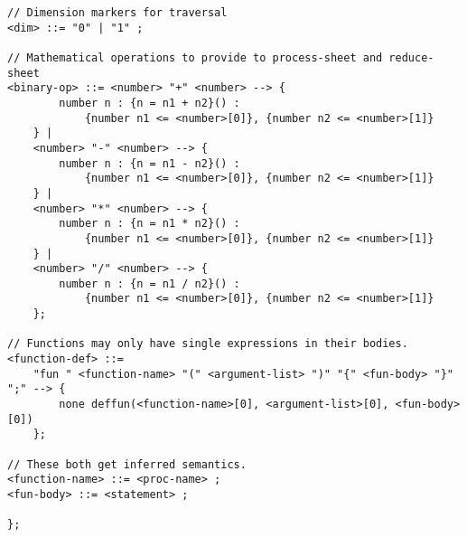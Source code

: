 \begin{verbatim}
// Dimension markers for traversal
<dim> ::= "0" | "1" ;

// Mathematical operations to provide to process-sheet and reduce-sheet
<binary-op> ::= <number> "+" <number> --> {
        number n : {n = n1 + n2}() :
            {number n1 <= <number>[0]}, {number n2 <= <number>[1]}
    } |
    <number> "-" <number> --> {
        number n : {n = n1 - n2}() :
            {number n1 <= <number>[0]}, {number n2 <= <number>[1]}
    } |
    <number> "*" <number> --> {
        number n : {n = n1 * n2}() :
            {number n1 <= <number>[0]}, {number n2 <= <number>[1]}
    } |
    <number> "/" <number> --> {
        number n : {n = n1 / n2}() :
            {number n1 <= <number>[0]}, {number n2 <= <number>[1]}
    };

// Functions may only have single expressions in their bodies. 
<function-def> ::= 
    "fun " <function-name> "(" <argument-list> ")" "{" <fun-body> "}" ";" --> {
        none deffun(<function-name>[0], <argument-list>[0], <fun-body>[0])
    };

// These both get inferred semantics.
<function-name> ::= <proc-name> ;
<fun-body> ::= <statement> ;

};

\end{verbatim}



